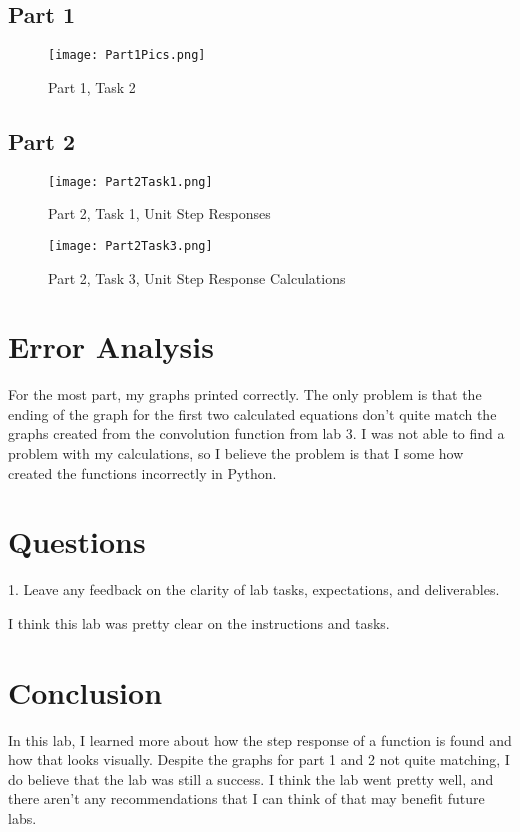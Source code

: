 \documentclass[12pt]{report}
\begin{document}
\subsection{Part 1}
\begin{figure}[H]
\begin{center}
\caption{Part 1, Task 2}
\texttt{[image: Part1Pics.png]}
\end{center}
\end{figure}

\subsection{Part 2} {
\begin{figure}[H]
\begin{center}
\caption{Part 2, Task 1, Unit Step Responses}
\texttt{[image: Part2Task1.png]}
\end{center}
\end{figure}

\begin{figure}[H]
\begin{center}
\caption{Part 2, Task 3, Unit Step Response Calculations}
\texttt{[image: Part2Task3.png]}
\end{center}
\end{figure}

}

\section{Error Analysis}
For the most part, my graphs printed correctly. The only
problem is that the ending of the graph for the first two
calculated equations don't quite match the graphs created
from the convolution function from lab 3. I was not able
to find a problem with my calculations, so I believe
the problem is that I some how created the functions
incorrectly in Python. 

\section{Questions}
1. Leave any feedback on the clarity of lab tasks,
expectations, and deliverables.

I think this lab was pretty clear on the instructions and
tasks.
\section{Conclusion}
In this lab, I learned more about how the step response of a 
function is found and how that looks visually. Despite the
graphs for part 1 and 2 not quite matching, I do believe that 
the lab was still a success. I think the lab went pretty well,
and there aren't any recommendations that I can think of 
that may benefit future labs.
\end{document}
